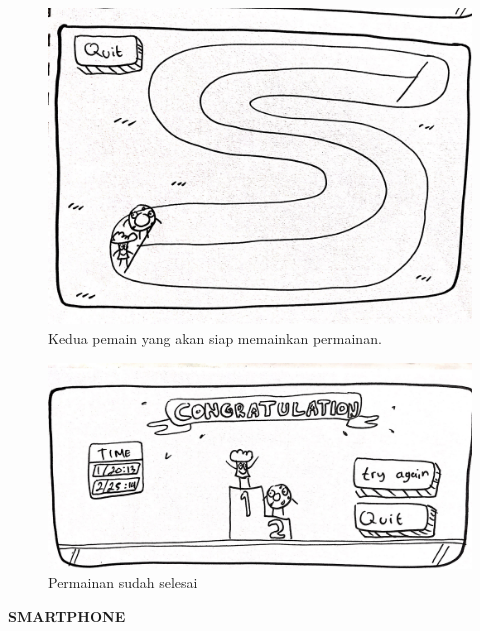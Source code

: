 \documentclass[a4paper,twoside]{article}
\begin{document}
\begin{enumerate}
		\begin{figure}[H]
			\centering
			\includegraphics[scale=0.1]{Gambar/web8_run1}
			\caption{Kedua pemain yang akan siap memainkan permainan.}
			\label{fig:8_web8_run1}
		\end{figure}
	
		\begin{figure}[H]
			\centering
			\includegraphics[scale=0.1]{Gambar/web9_end1}
			\caption{Permainan sudah selesai}
			\label{fig:9_web9_end1}
		\end{figure}
	
		\textbf{SMARTPHONE}
		

\end{enumerate}
\end{document}
